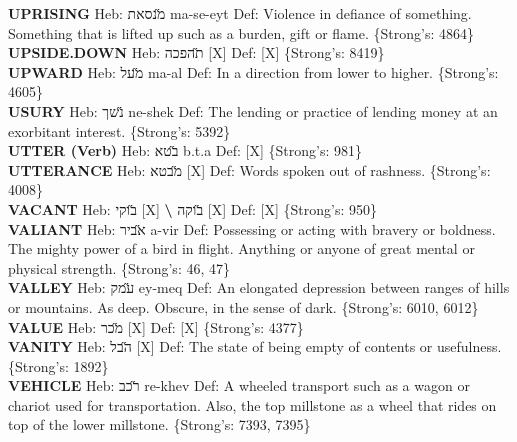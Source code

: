 {\textbf{UPRISING} Heb: {\large\H מנסאת} ma-se-eyt Def: Violence in defiance of something. Something that is lifted up such as a burden, gift or flame. \{Strong's: 4864\}\hfill{}\\

\textbf{UPSIDE.DOWN} Heb: {\large\H תהפכה} {[}X{]} Def: {[}X{]} \{Strong's: 8419\}\hfill{}\\

\textbf{UPWARD} Heb: {\large\H מעל} ma-al Def: In a direction from lower to higher. \{Strong's: 4605\}\hfill{}\\

\textbf{USURY} Heb: {\large\H נשך} ne-shek Def: The lending or practice of lending money at an exorbitant interest. \{Strong's: 5392\}\hfill{}\\

\textbf{UTTER (Verb)} Heb: {\large\H בטא} b.t.a Def: {[}X{]} \{Strong's: 981\}\hfill{}\\

\textbf{UTTERANCE} Heb: {\large\H מבטא} {[}X{]} Def: Words spoken out of rashness. \{Strong's: 4008\}\hfill{}\\

\textbf{VACANT} Heb: {\large\H בוקי} {[}X{]} \textbf{\textbackslash{}} {\large\H בוקה} {[}X{]} Def: {[}X{]} \{Strong's: 950\}\hfill{}\\

\textbf{VALIANT} Heb: {\large\H אביר} a-vir Def: Possessing or acting with bravery or boldness. The mighty power of a bird in flight. Anything or anyone of great mental or physical strength. \{Strong's: 46, 47\}\hfill{}\\

\textbf{VALLEY} Heb: {\large\H עמק} ey-meq Def: An elongated depression between ranges of hills or mountains. As deep. Obscure, in the sense of dark. \{Strong's: 6010, 6012\}\hfill{}\\

\textbf{VALUE} Heb: {\large\H מכר} {[}X{]} Def: {[}X{]} \{Strong's: 4377\}\hfill{}\\

\textbf{VANITY} Heb: {\large\H הבל} {[}X{]} Def: The state of being empty of contents or usefulness. \{Strong's: 1892\}\hfill{}\\

\textbf{VEHICLE} Heb: {\large\H רכב} re-khev Def: A wheeled transport such as a wagon or chariot used for transportation. Also, the top millstone as a wheel that rides on top of the lower millstone. \{Strong's: 7393, 7395\}\hfill{}\\

}
